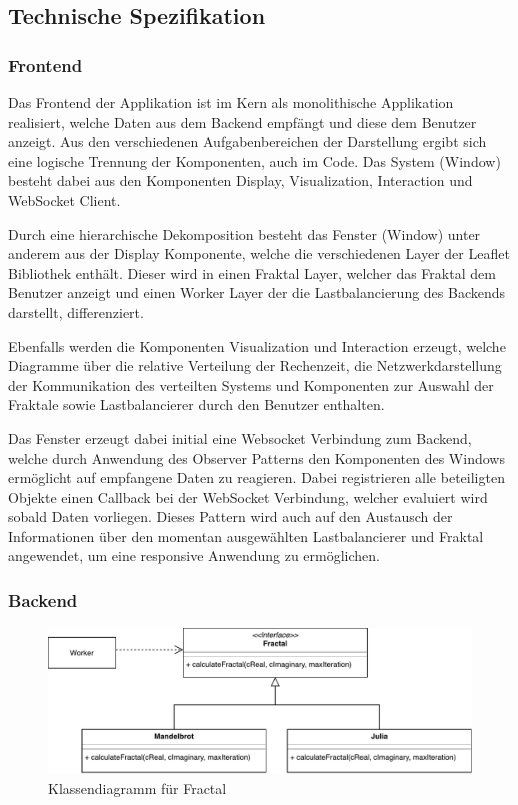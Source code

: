 
\subsection{Technische Spezifikation}

\subsubsection{Frontend}
Das Frontend der Applikation ist im Kern als monolithische Applikation realisiert, welche Daten aus dem Backend empfängt und diese dem Benutzer anzeigt. Aus den verschiedenen Aufgabenbereichen der Darstellung ergibt sich eine logische Trennung  der Komponenten, auch im Code. Das System (Window) besteht dabei aus den Komponenten Display, Visualization, Interaction und WebSocket Client.

Durch eine hierarchische Dekomposition besteht das Fenster (Window) unter anderem aus der Display Komponente, welche die verschiedenen Layer der Leaflet Bibliothek enthält. Dieser wird in einen Fraktal Layer, welcher das Fraktal dem Benutzer anzeigt und einen Worker Layer der die Lastbalancierung des Backends darstellt, differenziert. 

Ebenfalls werden die Komponenten Visualization und Interaction erzeugt, welche Diagramme über die relative Verteilung der Rechenzeit, die Netzwerkdarstellung der Kommunikation des verteilten Systems und Komponenten zur Auswahl der Fraktale sowie Lastbalancierer durch den Benutzer enthalten. 

Das Fenster erzeugt dabei initial eine Websocket Verbindung zum Backend, welche durch Anwendung des Observer Patterns den Komponenten des Windows ermöglicht auf empfangene Daten zu reagieren. Dabei registrieren alle beteiligten Objekte einen Callback bei der WebSocket Verbindung, welcher evaluiert wird sobald Daten vorliegen. Dieses Pattern wird auch auf den Austausch der Informationen über den momentan ausgewählten Lastbalancierer und Fraktal angewendet, um eine responsive Anwendung zu ermöglichen.

\subsubsection{Backend}

\begin{figure}
    \centering
        \includegraphics[width=0.8\linewidth]{img/Implementierung/Fractals.pdf}
        \caption{Klassendiagramm für Fractal}
    \label{fig:klassendiagramm_fractal}
\end{figure}
